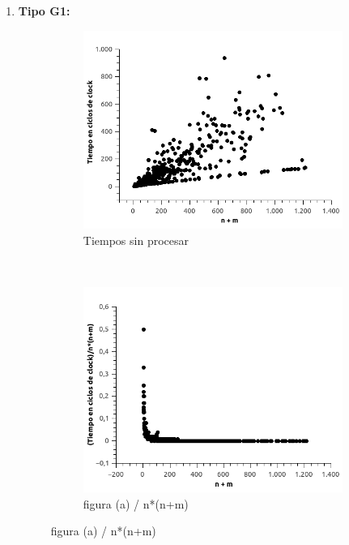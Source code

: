 \begin{enumerate}
\begin{figure}[H]
\end{figure}

\item \textbf{Tipo G1:}

\begin{figure}[H]
        \centering
        \begin{subfigure}[b]{0.5\textwidth}
                \includegraphics[width=\textwidth]{imagenes/ejer4-grafG1-1.jpg}
                \caption{Tiempos sin procesar}
        \end{subfigure}%
        ~ %
        \begin{subfigure}[b]{0.5\textwidth}
                \includegraphics[width=\textwidth]{imagenes/ejer4-grafG1-2.jpg}
                \caption{figura (a) / n*(n+m)}
        \end{subfigure}
        

\end{figure}
\end{enumerate}
